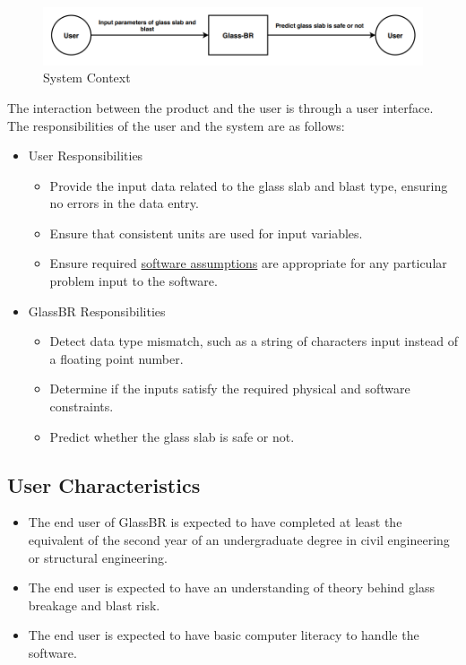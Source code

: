 \documentclass[12pt]{article}
\begin{document}
\begin{figure}[H]
\begin{center}
\includegraphics[width=\textwidth]{../../../../datafiles/glassbr/SystemContextFigure.png}
\caption{System Context}
\label{Figure:sysCtxDiag}
\end{center}
\end{figure}
The interaction between the product and the user is through a user interface. The responsibilities of the user and the system are as follows:

\begin{itemize}
\item{User Responsibilities}
\begin{itemize}
\item{Provide the input data related to the glass slab and blast type, ensuring no errors in the data entry.}
\item{Ensure that consistent units are used for input variables.}
\item{Ensure required \hyperref[Sec:Assumps]{software assumptions} are appropriate for any particular problem input to the software.}
\end{itemize}
\item{GlassBR Responsibilities}
\begin{itemize}
\item{Detect data type mismatch, such as a string of characters input instead of a floating point number.}
\item{Determine if the inputs satisfy the required physical and software constraints.}
\item{Predict whether the glass slab is safe or not.}
\end{itemize}
\end{itemize}
\subsection{User Characteristics}
\label{Sec:UserChars}
\begin{itemize}
\item{The end user of GlassBR is expected to have completed at least the equivalent of the second year of an undergraduate degree in civil engineering or structural engineering.}
\item{The end user is expected to have an understanding of theory behind glass breakage and blast risk.}
\item{The end user is expected to have basic computer literacy to handle the software.}
\end{itemize}
\end{document}

